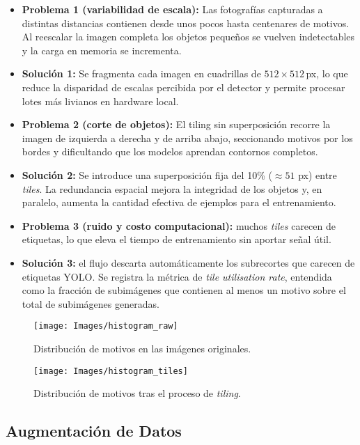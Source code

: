 \begin{itemize}
   \item \textbf{Problema 1 (variabilidad de escala):}
   Las fotografías capturadas a distintas distancias contienen desde unos pocos hasta centenares de motivos.
   Al reescalar la imagen completa los objetos pequeños se vuelven indetectables y la carga en memoria se incrementa.
   \item \textbf{Solución 1:}
   Se fragmenta cada imagen en cuadrillas de \(512\times512\)\,px, lo que reduce la disparidad de escalas percibida por el detector y permite procesar lotes más livianos en hardware local.

   \item \textbf{Problema 2 (corte de objetos):}
   El tiling sin superposición recorre la imagen de izquierda a derecha y de arriba abajo, seccionando motivos por los bordes y dificultando que los modelos aprendan contornos completos.
   \item \textbf{Solución 2:}
   Se introduce una superposición fija del 10\% ($\approx 51$ px) entre \emph{tiles}.
   La redundancia espacial mejora la integridad de los objetos y, en paralelo, aumenta la cantidad efectiva de ejemplos para el entrenamiento.

   \item \textbf{Problema 3 (ruido y costo computacional):} muchos \emph{tiles} carecen de etiquetas, lo que eleva el tiempo de entrenamiento sin aportar señal útil.
   \item \textbf{Solución 3:} el flujo descarta automáticamente los subrecortes que carecen de etiquetas YOLO.
      Se registra la métrica de \emph{tile utilisation rate}, entendida como la fracción de subimágenes que contienen al menos un motivo sobre el total de subimágenes generadas.
\end{itemize}

\begin{figure}[!h]
  \centering
  \texttt{[image: Images/histogram\_raw]}
  \caption{Distribución de motivos en las imágenes originales.}
  \label{fig:hist_raw}
\end{figure}

\begin{figure}[!h]
  \centering
  \texttt{[image: Images/histogram\_tiles]}
  \caption{Distribución de motivos tras el proceso de \textit{tiling}.}
  \label{fig:hist_tiles}
\end{figure}

\subsection{Augmentación de Datos}\label{ssec:augmentacion}

